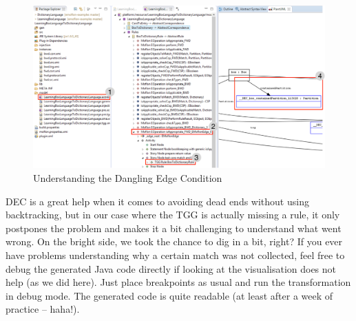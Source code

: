 \begin{figure}[htbp]
\begin{center}
  \includegraphics[width=\textwidth]{../../org.moflon.doc.handbook.04_tripleGraphTransformations/5_inAction/aImages/explanationDEC}
  \caption{Understanding the Dangling Edge Condition}
  \label{fig:dec}
\end{center}
\end{figure}

DEC is a great help when it comes to avoiding dead ends without using backtracking, but in our case where the TGG is actually missing a rule, it only postpones the problem and makes it a bit challenging to understand what went wrong.
On the bright side, we took the chance to dig in a bit, right?
If you ever have problems understanding why a certain match was not collected, feel free to debug the generated Java code directly if looking at the visualisation does not help (as we did here).
Just place breakpoints as usual and run the transformation in debug mode.
The generated code is quite readable (at least after a week of practice -- haha!).


